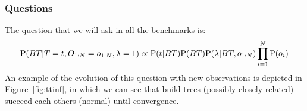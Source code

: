 \subsubsection{Questions}
The question that we will ask in all the benchmarks is:
\begin{equation}
\mathrm{P}(BT|T=t, O_{1:N}=o_{1:N}, \lambda = 1)  \propto \mathrm{P}(t|BT)\mathrm{P}(BT) \mathrm{P}(\lambda | BT, o_{1:N})\prod_{i=1}^N\mathrm{P}(o_{i})
\end{equation}
An example of the evolution of this question with new observations is depicted in Figure~\ref{fig:ttinf}, in which we can see that build trees (possibly closely related) succeed each others (normal) until convergence.

